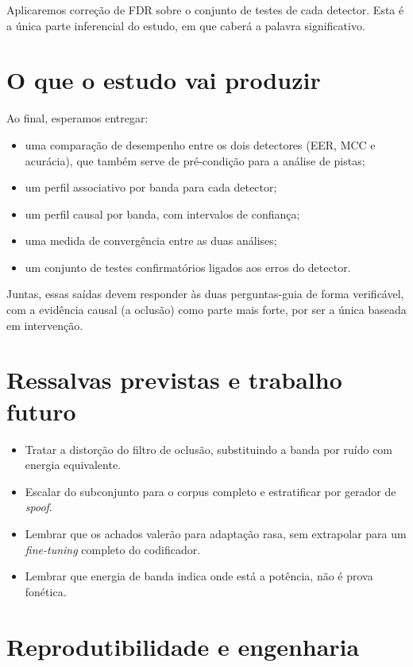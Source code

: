 \documentclass[11pt,a4paper]{article}
\begin{document}
Aplicaremos correção de FDR sobre o conjunto de testes de cada detector. Esta é a
única parte inferencial do estudo, em que caberá a palavra significativo.

\section{O que o estudo vai produzir}

Ao final, esperamos entregar:

\begin{itemize}
  \item uma comparação de desempenho entre os dois detectores (EER, MCC e
        acurácia), que também serve de pré-condição para a análise de pistas;
  \item um perfil associativo por banda para cada detector;
  \item um perfil causal por banda, com intervalos de confiança;
  \item uma medida de convergência entre as duas análises;
  \item um conjunto de testes confirmatórios ligados aos erros do detector.
\end{itemize}

Juntas, essas saídas devem responder às duas perguntas-guia de forma verificável,
com a evidência causal (a oclusão) como parte mais forte, por ser a única baseada
em intervenção.

\section{Ressalvas previstas e trabalho futuro}

\begin{itemize}
  \item Tratar a distorção do filtro de oclusão, substituindo a banda por ruído
        com energia equivalente.
  \item Escalar do subconjunto para o corpus completo e estratificar por gerador
        de \emph{spoof}.
  \item Lembrar que os achados valerão para adaptação rasa, sem extrapolar para um
        \emph{fine-tuning} completo do codificador.
  \item Lembrar que energia de banda indica onde está a potência, não é prova
        fonética.
\end{itemize}

\section{Reprodutibilidade e engenharia}
\end{document}
